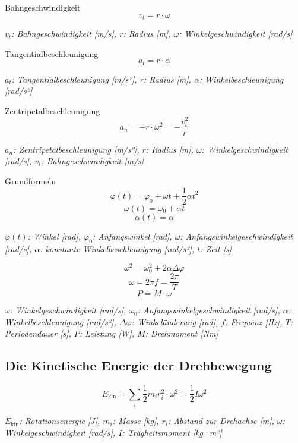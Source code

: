 \documentclass[a4paper,10pt]{article}
\newenvironment{displayformula}
{
	\begin{framed}
		\color{formulaColor}
	}
	{\end{framed}}
\newcommand{\formulalegend}[1]{%
	\par\vspace{0.5ex}%
	{{\color{legendColor}\RaggedRight\small\textit{#1}}}%
	\par\vspace{1.5ex}%
}
\begin{document}
\begin{displayformula}
	Bahngeschwindigkeit
	\[
	v_t = r \cdot \omega
	\]
\end{displayformula}
\formulalegend{
	\( v_t \): Bahngeschwindigkeit [m/s], \( r \): Radius [m], \( \omega \): Winkelgeschwindigkeit [rad/s]
}

\begin{displayformula}
	Tangentialbeschleunigung
	\[
	a_t = r \cdot \alpha
	\]
\end{displayformula}
\formulalegend{
	\( a_t \): Tangentialbeschleunigung [m/s²], \( r \): Radius [m], \( \alpha \): Winkelbeschleunigung [rad/s²]
}

\begin{displayformula}
	Zentripetalbeschleunigung
	\[
	a_n = -r \cdot \omega^2 = - \frac{v_t^2}{r}
	\]
\end{displayformula}
\formulalegend{
	\( a_n \): Zentripetalbeschleunigung [m/s²], \( r \): Radius [m], \( \omega \): Winkelgeschwindigkeit [rad/s], \( v_t \): Bahngeschwindigkeit [m/s]
}

\begin{displayformula}
	Grundformeln
	\[
	\varphi (t) = \varphi_0 + \omega t + \frac{1}{2} \alpha t^2
	\]
	\[
	\omega (t) = \omega_0 + \alpha t
	\]
	\[
	\alpha (t) = \alpha
	\]
\end{displayformula}
\formulalegend{
	\( \varphi(t) \): Winkel [rad], \( \varphi_0 \): Anfangswinkel [rad], \( \omega \): Anfangswinkelgeschwindigkeit [rad/s], \( \alpha \): konstante Winkelbeschleunigung [rad/s²], \( t \): Zeit [s]
}

\begin{displayformula}
	\[
	\omega^2 = \omega_0^2 + 2\alpha \Delta\varphi
	\]
	\[
	\omega = 2\pi f = \frac{2\pi}{T}
	\]
	\[
	P = M \cdot \omega
	\]
\end{displayformula}
\formulalegend{
	\( \omega \): Winkelgeschwindigkeit [rad/s], \( \omega_0 \): Anfangswinkelgeschwindigkeit [rad/s], \( \alpha \): Winkelbeschleunigung [rad/s²], \( \Delta \varphi \): Winkeländerung [rad], \( f \): Frequenz [Hz], \( T \): Periodendauer [s], \( P \): Leistung [W], \( M \): Drehmoment [Nm]
}

\subsection{Die Kinetische Energie der Drehbewegung}

\begin{displayformula}
	\[
	E_{\text{kin}} = \sum_i \frac{1}{2} m_i r_i^2 \cdot \omega^2 = \frac{1}{2} I \omega^2
	\]
\end{displayformula}
\formulalegend{
	\( E_{\text{kin}} \): Rotationsenergie [J], \( m_i \): Masse [kg], \( r_i \): Abstand zur Drehachse [m], \( \omega \): Winkelgeschwindigkeit [rad/s], \( I \): Trägheitsmoment [kg·m²]
}
\end{document}
